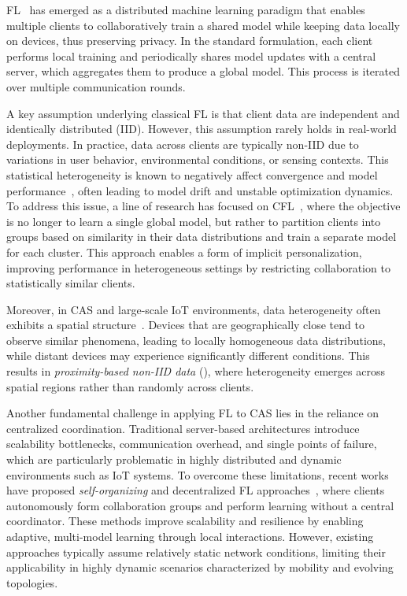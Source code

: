 \documentclass[conference]{IEEEtran}
\theoremstyle{plain}
\theoremstyle{definition}
\begin{document}
\acf{FL}~\cite{DBLP:conf/aistats/McMahanMRHA17,DBLP:journals/corr/McMahanMRA16} 
 has emerged as a distributed machine learning paradigm 
 that enables multiple clients to collaboratively train a shared model
 while keeping data locally on devices, 
 thus preserving privacy. 
% 
In the standard formulation, 
 each client performs local training and periodically shares model updates with a central server, 
 which aggregates them to produce a global model. 
% 
This process is iterated over multiple communication rounds.

A key assumption underlying classical FL is that client data are 
 independent and identically distributed (IID).
% 
However, 
 this assumption rarely holds in real-world deployments. 
% 
In practice, 
 data across clients are typically non-IID due to variations in user behavior, 
 environmental conditions, or sensing contexts. 
% 
This statistical heterogeneity is known to negatively affect convergence and model performance~\cite{DBLP:journals/csur/ChungLLCH26,DBLP:journals/ijon/ZhuXLJ21}, 
 often leading to model drift and unstable optimization dynamics.
%
To address this issue, 
 a line of research has focused on \acl{CFL}~\cite{liu2025survey}, 
 where the objective is no longer to learn a single global model, 
 but rather to partition clients into groups based on similarity in their data distributions 
 and train a separate model for each cluster. 
% 
This approach enables a form of implicit personalization, 
 improving performance in heterogeneous settings by restricting collaboration 
 to statistically similar clients. 

Moreover, 
 in \ac{CAS} and large-scale IoT environments, 
 data heterogeneity often exhibits a 
 spatial structure~\cite{DBLP:journals/jors/DominiIALV26}. 
% 
Devices that are geographically close tend to observe similar phenomena, 
 leading to locally homogeneous data distributions, 
 while distant devices may experience significantly different conditions. 
% 
This results in \emph{proximity-based non-IID data} (), 
 where heterogeneity emerges across spatial regions rather than randomly across clients. 

Another fundamental challenge in applying FL to CAS lies in the reliance on centralized coordination. 
%
Traditional server-based architectures introduce scalability bottlenecks, 
 communication overhead, 
 and single points of failure, 
 which are particularly problematic in highly distributed 
 and dynamic environments such as IoT systems. 
%
To overcome these limitations, 
 recent works have proposed \emph{self-organizing} and decentralized FL 
 approaches~\cite{DBLP:journals/iot/DominiFAVE26,DBLP:journals/lmcs/DominiAEV26}, 
 where clients autonomously form collaboration groups and perform learning without a central coordinator. 
%
These methods improve scalability and resilience by enabling adaptive, 
 multi-model learning through local interactions. 
% 
However, 
 existing approaches typically assume relatively static network conditions, 
 limiting their applicability in highly dynamic scenarios characterized by mobility 
 and evolving topologies. 
\end{document}
